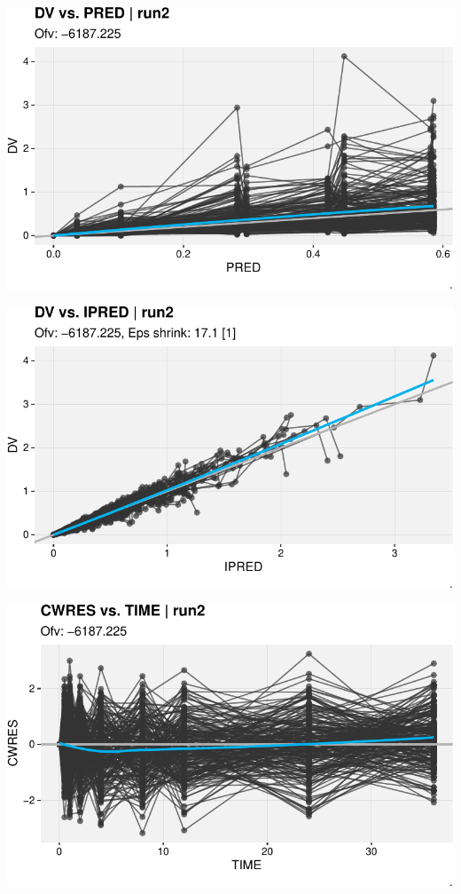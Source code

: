 \documentclass[
  letterpaper,
  toc=chapterentrywithdots,
  11pt,
  headings=small]{scrreprt}
\begin{document}
\includegraphics{sec/results_files/figure-pdf/unnamed-chunk-4-5.pdf}

\includegraphics{sec/results_files/figure-pdf/unnamed-chunk-4-6.pdf}

\includegraphics{sec/results_files/figure-pdf/unnamed-chunk-4-7.pdf}
\end{document}
